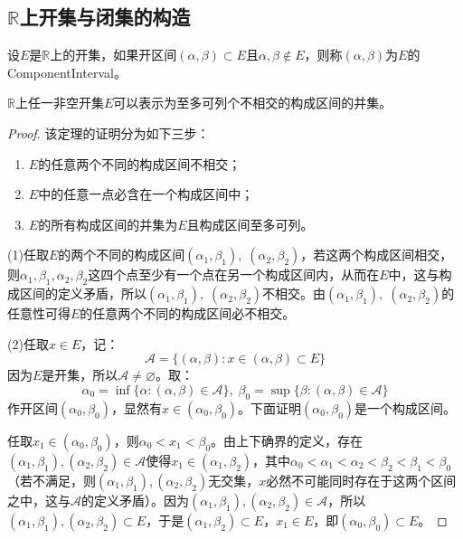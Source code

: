 \subsection{$\mathbb{R}$上开集与闭集的构造}
\begin{definition}
	设$E$是$\mathbb{R}$上的开集，如果开区间$(\alpha,\beta)\subset E$且$\alpha,\beta\notin E$，则称$(\alpha,\beta)$为$E$的\gls{ComponentInterval}。
\end{definition}
\begin{theorem}\label{theo:ROpenSetComponentInterval}
	$\mathbb{R}$上任一非空开集$E$可以表示为至多可列个不相交的构成区间的并集。
\end{theorem}
\begin{proof}
	该定理的证明分为如下三步：
	\begin{enumerate}
		\item $E$的任意两个不同的构成区间不相交；
		\item $E$中的任意一点必含在一个构成区间中；
		\item $E$的所有构成区间的并集为$E$且构成区间至多可列。
	\end{enumerate}\par
	(1)任取$E$的两个不同的构成区间$(\alpha_1,\beta_1),\;(\alpha_2,\beta_2)$，若这两个构成区间相交，则$\alpha_1,\beta_1,\alpha_2,\beta_2$这四个点至少有一个点在另一个构成区间内，从而在$E$中，这与构成区间的定义矛盾，所以$(\alpha_1,\beta_1),\;(\alpha_2,\beta_2)$不相交。由$(\alpha_1,\beta_1),\;(\alpha_2,\beta_2)$的任意性可得$E$的任意两个不同的构成区间必不相交。\par
	(2)任取$x\in E$，记：
	\begin{equation*}
		\mathscr{A}=\{(\alpha,\beta):x\in(\alpha,\beta)\subset E\}
	\end{equation*}
	因为$E$是开集，所以$\mathscr{A}\ne\varnothing$。取：
	\begin{equation*}
		\alpha_0=\inf\{\alpha:(\alpha,\beta)\in \mathscr{A}\},\;
		\beta_0=\sup\{\beta:(\alpha,\beta)\in \mathscr{A}\}
	\end{equation*}
	作开区间$(\alpha_0,\beta_0)$，显然有$x\in(\alpha_0,\beta_0)$。下面证明$(\alpha_0,\beta_0)$是一个构成区间。\par
	任取$x_1\in(\alpha_0,\beta_0)$，则$\alpha_0<x_1<\beta_0$。由上下确界的定义，存在$(\alpha_1,\beta_1),(\alpha_2,\beta_2)\in \mathscr{A}$使得$x_1\in(\alpha_1,\beta_2)$，其中$\alpha_0<\alpha_1<\alpha_2<\beta_2<\beta_1<\beta_0$（若不满足，则$(\alpha_1,\beta_1),(\alpha_2,\beta_2)$无交集，$x$必然不可能同时存在于这两个区间之中，这与$\mathscr{A}$的定义矛盾）。因为$(\alpha_1,\beta_1),(\alpha_2,\beta_2)\in \mathscr{A}$，所以$(\alpha_1,\beta_1),(\alpha_2,\beta_2)\subset E$，于是$(\alpha_1,\beta_2)\subset E$，$x_1\in E$，即$(\alpha_0,\beta_0)\subset E$。\par

\end{proof}
